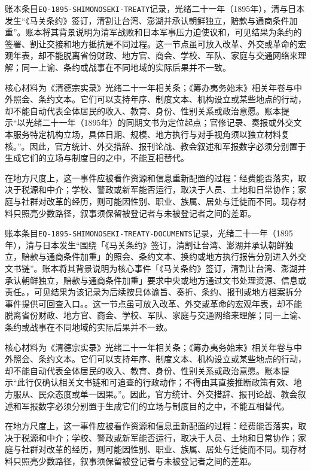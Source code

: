 账本条目\texttt{EQ-1895-SHIMONOSEKI-TREATY}记录，光绪二十一年（1895年），清与日本发生“《马关条约》签订，清割让台湾、澎湖并承认朝鲜独立，赔款与通商条件加重”。账本将其背景说明为清军战败和日本军事压力迫使议和，可见结果为条约的签署、割让交接和地方抵抗是不同过程。这一节点虽可放入改革、外交或革命的宏观年表，却不能脱离省份财政、地方官、商会、学校、军队、家庭与交通网络来理解；同一上谕、条约或战事在不同地域的实际后果并不一致。

核心材料为《清德宗实录》光绪二十一年相关条；《筹办夷务始末》相关年卷与中外照会、条约文本。它们可以支持年序、制度文本、机构设立或某些地点的行动，却不能自动代表全体居民的收入、教育、身份、性别关系或政治意愿。账本提示“以光绪二十一年（1895年）的同期文书为定位起点；官修记录、奏报或外交文本服务特定机构立场，具体日期、规模、地方执行与对手视角须以独立材料复核。”。因此，官方统计、外交措辞、报刊论战、教会叙述和军报数字必须分别置于生成它们的立场与制度目的之中，不能互相替代。

在地方尺度上，这一事件应被看作资源和信息重新配置的过程：经费能否落实，取决于税源和中介；学校、警政或新军能否运行，取决于人员、土地和日常协作；家庭与社群对改革的经历，则可能因性别、职业、族属、居处与迁徙而不同。现存材料只照亮少数路径，叙事须保留被登记者与未被登记者之间的差距。

账本条目\texttt{EQ-1895-SHIMONOSEKI-TREATY-DOCUMENTS}记录，光绪二十一年（1895年），清与日本发生“围绕「《马关条约》签订，清割让台湾、澎湖并承认朝鲜独立，赔款与通商条件加重」的照会、条约文本、换约或地方执行报告分别进入外交文书链”。账本将其背景说明为核心事件「《马关条约》签订，清割让台湾、澎湖并承认朝鲜独立，赔款与通商条件加重」要求中央或地方通过文书处理资源、信息或责任。，可见结果为该记录为后续按具体谕旨、奏折、条约、报刊或地方档案拆分事件提供可回查入口。。这一节点虽可放入改革、外交或革命的宏观年表，却不能脱离省份财政、地方官、商会、学校、军队、家庭与交通网络来理解；同一上谕、条约或战事在不同地域的实际后果并不一致。

核心材料为《清德宗实录》光绪二十一年相关条；《筹办夷务始末》相关年卷与中外照会、条约文本。它们可以支持年序、制度文本、机构设立或某些地点的行动，却不能自动代表全体居民的收入、教育、身份、性别关系或政治意愿。账本提示“此行仅确认相关文书链和可追查的行政动作；不得由其直接推断政策有效、地方服从、民众态度或单一因果。”。因此，官方统计、外交措辞、报刊论战、教会叙述和军报数字必须分别置于生成它们的立场与制度目的之中，不能互相替代。

在地方尺度上，这一事件应被看作资源和信息重新配置的过程：经费能否落实，取决于税源和中介；学校、警政或新军能否运行，取决于人员、土地和日常协作；家庭与社群对改革的经历，则可能因性别、职业、族属、居处与迁徙而不同。现存材料只照亮少数路径，叙事须保留被登记者与未被登记者之间的差距。

